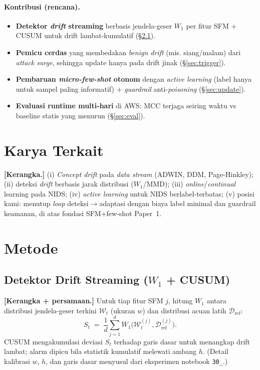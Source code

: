 \documentclass[11pt,a4paper]{article}
\begin{document}
\paragraph{Kontribusi (rencana).}
\begin{itemize}
  \item \textbf{Detektor \emph{drift} streaming} berbasis jendela-geser $W_1$ per
  fitur SFM $+$ CUSUM untuk drift lambat-kumulatif (\S\ref{sec:detector}).
  \item \textbf{Pemicu cerdas} yang membedakan \emph{benign drift} (mis.
  siang/malam) dari \emph{attack surge}, sehingga update hanya pada drift jinak
  (\S\ref{sec:trigger}).
  \item \textbf{Pembaruan \emph{micro-few-shot} otonom} dengan \emph{active
  learning} (label hanya untuk sampel paling informatif) $+$ \emph{guardrail}
  anti-\emph{poisoning} (\S\ref{sec:update}).
  \item \textbf{Evaluasi runtime multi-hari} di AWS: MCC terjaga seiring waktu
  vs baseline statis yang menurun (\S\ref{sec:eval}).
\end{itemize}

\section{Karya Terkait}
\label{sec:related}
\textbf{[Kerangka.]} (i) \emph{Concept drift} pada \emph{data stream} (ADWIN,
DDM, Page-Hinkley); (ii) deteksi \emph{drift} berbasis jarak distribusi
($W_1$/MMD); (iii) \emph{online}/\emph{continual} learning pada NIDS;
(iv) \emph{active learning} untuk NIDS berlabel-terbatas; (v) posisi kami:
menutup \emph{loop} deteksi$\rightarrow$adaptasi dengan biaya label minimal dan
guardrail keamanan, di atas fondasi SFM$+$few-shot Paper~1.

\section{Metode}
\label{sec:method}

\subsection{Detektor Drift Streaming ($W_1$ + CUSUM)}
\label{sec:detector}
\textbf{[Kerangka + persamaan.]} Untuk tiap fitur SFM $j$, hitung $W_1$ antara
distribusi jendela-geser terkini $\mathcal{W}_t$ (ukuran $w$) dan distribusi
acuan latih $\mathcal{D}_{\text{ref}}$:
\begin{equation}
\label{eq:driftscore}
S_t \;=\; \frac{1}{d}\sum_{j=1}^{d} W_1\!\big(\mathcal{W}_t^{(j)}, \mathcal{D}_{\text{ref}}^{(j)}\big).
\end{equation}
CUSUM mengakumulasi deviasi $S_t$ terhadap garis dasar untuk menangkap drift
lambat; alarm dipicu bila statistik kumulatif melewati ambang $h$. (Detail
kalibrasi $w$, $h$, dan garis dasar menyusul dari eksperimen notebook \texttt{30\_}.)
\end{document}
